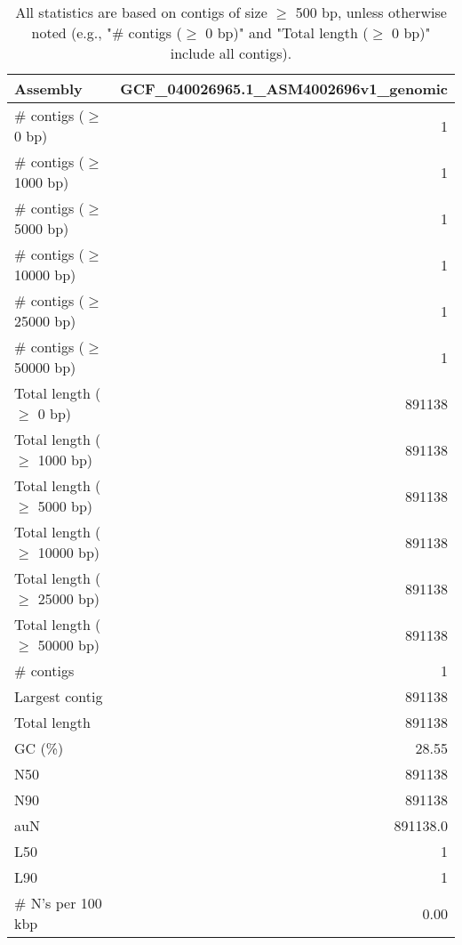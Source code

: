\documentclass[12pt,a4paper]{article}
\begin{document}
\begin{table}[ht]
\begin{center}
\caption{All statistics are based on contigs of size $\geq$ 500 bp, unless otherwise noted (e.g., "\# contigs ($\geq$ 0 bp)" and "Total length ($\geq$ 0 bp)" include all contigs).}
\begin{tabular}{|l*{1}{|r}|}
\hline
Assembly & GCF\_040026965.1\_ASM4002696v1\_genomic \\ \hline
\# contigs ($\geq$ 0 bp) & 1 \\ \hline
\# contigs ($\geq$ 1000 bp) & 1 \\ \hline
\# contigs ($\geq$ 5000 bp) & 1 \\ \hline
\# contigs ($\geq$ 10000 bp) & 1 \\ \hline
\# contigs ($\geq$ 25000 bp) & 1 \\ \hline
\# contigs ($\geq$ 50000 bp) & 1 \\ \hline
Total length ($\geq$ 0 bp) & 891138 \\ \hline
Total length ($\geq$ 1000 bp) & 891138 \\ \hline
Total length ($\geq$ 5000 bp) & 891138 \\ \hline
Total length ($\geq$ 10000 bp) & 891138 \\ \hline
Total length ($\geq$ 25000 bp) & 891138 \\ \hline
Total length ($\geq$ 50000 bp) & 891138 \\ \hline
\# contigs & 1 \\ \hline
Largest contig & 891138 \\ \hline
Total length & 891138 \\ \hline
GC (\%) & 28.55 \\ \hline
N50 & 891138 \\ \hline
N90 & 891138 \\ \hline
auN & 891138.0 \\ \hline
L50 & 1 \\ \hline
L90 & 1 \\ \hline
\# N's per 100 kbp & 0.00 \\ \hline
\end{tabular}
\end{center}
\end{table}
\end{document}
